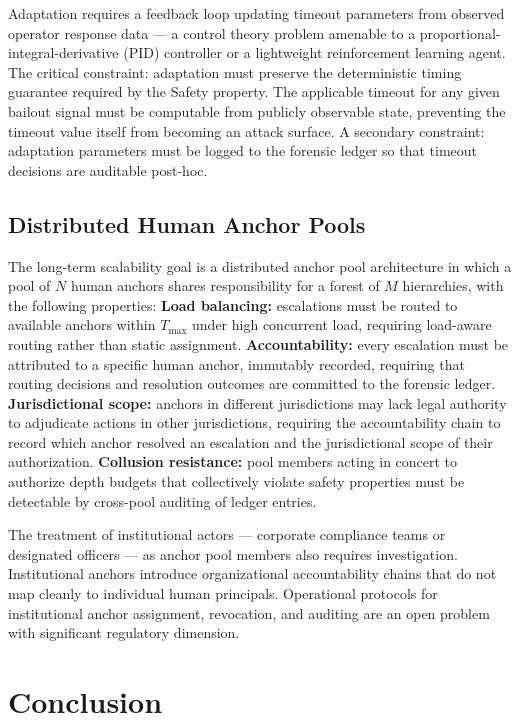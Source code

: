 Adaptation requires a feedback loop updating timeout parameters from observed operator response data — a control theory problem amenable to a proportional-integral-derivative (PID) controller or a lightweight reinforcement learning agent. The critical constraint: adaptation must preserve the deterministic timing guarantee required by the Safety property. The applicable timeout for any given bailout signal must be computable from publicly observable state, preventing the timeout value itself from becoming an attack surface. A secondary constraint: adaptation parameters must be logged to the forensic ledger so that timeout decisions are auditable post-hoc.

\subsection{Distributed Human Anchor Pools}
\label{sec:future-anchor-pools}

The long-term scalability goal is a distributed anchor pool architecture in which a pool of $N$ human anchors shares responsibility for a forest of $M$ hierarchies, with the following properties: \textbf{Load balancing:} escalations must be routed to available anchors within $T_{\max}$ under high concurrent load, requiring load-aware routing rather than static assignment. \textbf{Accountability:} every escalation must be attributed to a specific human anchor, immutably recorded, requiring that routing decisions and resolution outcomes are committed to the forensic ledger. \textbf{Jurisdictional scope:} anchors in different jurisdictions may lack legal authority to adjudicate actions in other jurisdictions, requiring the accountability chain to record which anchor resolved an escalation and the jurisdictional scope of their authorization. \textbf{Collusion resistance:} pool members acting in concert to authorize depth budgets that collectively violate safety properties must be detectable by cross-pool auditing of ledger entries.

The treatment of institutional actors — corporate compliance teams or designated officers — as anchor pool members also requires investigation. Institutional anchors introduce organizational accountability chains that do not map cleanly to individual human principals. Operational protocols for institutional anchor assignment, revocation, and auditing are an open problem with significant regulatory dimension.

\section{Conclusion}
\label{sec:conclusion}

